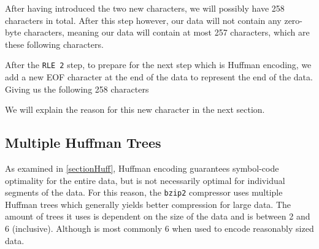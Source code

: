\documentclass{article}
\begin{document}
After having introduced the two new characters, we will possibly have 258 characters in total. After this step however, our data will not contain any zero-byte characters, meaning our data will contain at most 257 characters, which are these following characters.
\begin{center}
\end{center}
After the \texttt{RLE 2} step, to prepare for the next step which is Huffman encoding, we add a new EOF character at the end of the data to represent the end of the data. Giving us the following 258 characters
\begin{center}
\end{center}
We will explain the reason for this new character in the next section.


\subsection{Multiple Huffman Trees}
As examined in \cref{sectionHuff}, Huffman encoding guarantees symbol-code optimality for the entire data, but is not necessarily optimal for individual segments of the data. For this reason, the \texttt{bzip2} compressor uses multiple Huffman trees which generally yields better compression for large data. The amount of trees it uses is dependent on the size of the data and is between 2 and 6 (inclusive). Although is most commonly 6 when used to encode reasonably sized data.
\end{document}
